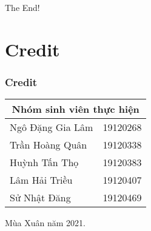 \documentclass[12pt]{beamer}
\begin{document}
    \begin{frame}
        \Large \centering
        The End!
    \end{frame}

    \section{Credit}
    \begin{frame}
        \frametitle{Credit}
        \centering
        \begin{table}[H]
            \begin{tabular}[t]{ll}
                \toprule
                \multicolumn{2}{c}{Nhóm sinh viên thực hiện} \\
                \midrule
                Ngô Đặng Gia Lâm & 19120268\\
                Trần Hoàng Quân & 19120338\\
                Huỳnh Tấn Thọ & 19120383\\
                Lâm Hải Triều & 19120407\\
                Sử Nhật Đăng & 19120469\\
                \bottomrule
            \end{tabular}
        \end{table}
        Mùa Xuân năm 2021.
    \end{frame}
\end{document}

